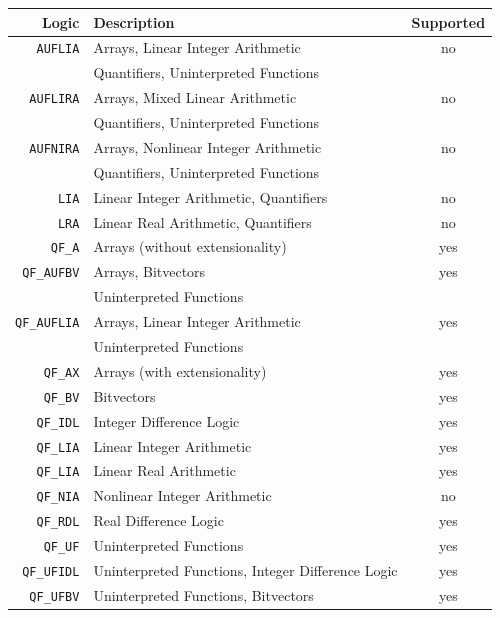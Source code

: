 \documentclass[11pt,twoside,fleqn,openright,titlepage]{cslreport}
\begin{document}
\begin{table}
\begin{center}
\renewcommand{\arraystretch}{1}
\begin{tabular}{|r|l|c|}
\hline
\textbf{Logic} & \textbf{Description} & \textbf{Supported} \\
\hline
\hline
\texttt{AUFLIA} & Arrays, Linear Integer Arithmetic & no \\
 & Quantifiers, Uninterpreted Functions & \\
\hline
\texttt{AUFLIRA} & Arrays, Mixed Linear Arithmetic & no \\
 & Quantifiers, Uninterpreted Functions & \\
\hline
\texttt{AUFNIRA} & Arrays, Nonlinear Integer Arithmetic & no \\
                &  Quantifiers, Uninterpreted Functions & \\
\hline
\texttt{LIA} & Linear Integer Arithmetic, Quantifiers & no \\
\hline
\texttt{LRA} & Linear Real Arithmetic, Quantifiers & no \\
\hline
\texttt{QF\_A} & Arrays (without extensionality) & yes \\
\hline
\texttt{QF\_AUFBV} & Arrays, Bitvectors & yes \\
 & Uninterpreted Functions & \\
\hline
\texttt{QF\_AUFLIA} & Arrays, Linear Integer Arithmetic & yes \\
 & Uninterpreted Functions & \\
\hline
\texttt{QF\_AX} & Arrays (with extensionality) & yes \\
\hline
\texttt{QF\_BV} & Bitvectors & yes \\
\hline
\texttt{QF\_IDL} & Integer Difference Logic  & yes \\
\hline
\texttt{QF\_LIA} & Linear Integer Arithmetic  & yes \\
\hline
\texttt{QF\_LIA} & Linear Real Arithmetic  & yes \\
\hline
\texttt{QF\_NIA} & Nonlinear Integer Arithmetic  & no \\
\hline
\texttt{QF\_RDL} & Real Difference Logic  & yes \\
\hline
\texttt{QF\_UF} & Uninterpreted Functions  & yes \\
\hline
\texttt{QF\_UFIDL} & Uninterpreted Functions, Integer Difference Logic & yes \\
\hline
\texttt{QF\_UFBV} & Uninterpreted Functions, Bitvectors & yes \\

\end{tabular}
\end{center}
\end{table}
\end{document}

